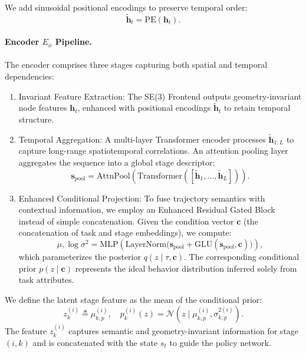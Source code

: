 \documentclass{article}
\begin{document}
We add sinusoidal positional encodings to preserve temporal order:
\begin{equation*}
\tilde{\mathbf{h}}_t = \mathrm{PE}(\mathbf{h}_t).
\end{equation*}

\paragraph{Encoder $E_{\phi}$ Pipeline.}
The encoder comprises three stages capturing both spatial and temporal dependencies:

\begin{enumerate}
    \item Invariant Feature Extraction: The SE(3) Frontend outputs geometry-invariant node features $\mathbf{h}_t$, enhanced with positional encodings $\tilde{\mathbf{h}}_t$ to retain temporal structure.
    
    \item Temporal Aggregation: A multi-layer Transformer encoder processes $\tilde{\mathbf{h}}_{1:L}$ to capture long-range spatiotemporal correlations. 
    An attention pooling layer aggregates the sequence into a global stage descriptor:
    \begin{equation*}
    \mathbf{s}_{\mathrm{pool}} = \mathrm{AttnPool}\!\left(\mathrm{Transformer}\!\left([\tilde{\mathbf{h}}_1, \ldots, \tilde{\mathbf{h}}_L]\right)\right).
    \end{equation*}

    \item Enhanced Conditional Projection: To fuse trajectory semantics with contextual information, we employ an Enhanced Residual Gated Block instead of simple concatenation. 
    Given the condition vector $\mathbf{c}$ (the concatenation of task and stage embeddings), we compute:
    \begin{equation*}
    \mu, \log\sigma^2 = \mathrm{MLP}\!\left(\mathrm{LayerNorm}\!\big(\mathbf{s}_{\mathrm{pool}} + \mathrm{GLU}(\mathbf{s}_{\mathrm{pool}}, \mathbf{c})\big)\right),
    \end{equation*}
    which parameterizes the posterior $q(z \mid \tau, \mathbf{c})$. 
    The corresponding conditional prior $p(z \mid \mathbf{c})$ represents the ideal behavior distribution inferred solely from task attributes.
\end{enumerate}

We define the latent stage feature as the mean of the conditional prior:
\begin{equation*}
z^{(i)}_{k} \triangleq \mu^{(i)}_{k,p}, \quad p^{(i)}_{k}(z) = \mathcal{N}\!\left(z \mid \mu^{(i)}_{k,p}, \sigma^{2 (i)}_{k,p}\right).
\end{equation*}
The feature $z^{(i)}_{k}$ captures semantic and geometry-invariant information for stage $(i,k)$ and is concatenated with the state $s_t$ to guide the policy network.
\end{document}
